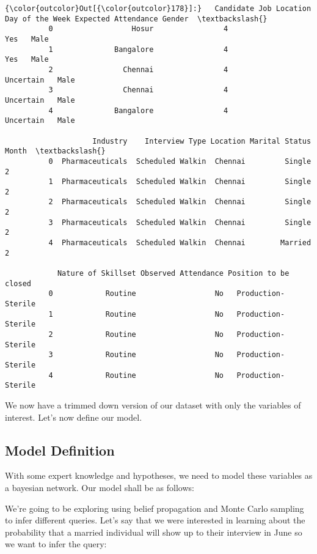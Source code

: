 \documentclass[11pt]{article}
\begin{document}
\begin{Verbatim}[commandchars=\\\{\}]
{\color{outcolor}Out[{\color{outcolor}178}]:}   Candidate Job Location  Day of the Week Expected Attendance Gender  \textbackslash{}
          0                  Hosur                4                 Yes   Male   
          1              Bangalore                4                 Yes   Male   
          2                Chennai                4           Uncertain   Male   
          3                Chennai                4           Uncertain   Male   
          4              Bangalore                4           Uncertain   Male   
          
                    Industry    Interview Type Location Marital Status  Month  \textbackslash{}
          0  Pharmaceuticals  Scheduled Walkin  Chennai         Single      2   
          1  Pharmaceuticals  Scheduled Walkin  Chennai         Single      2   
          2  Pharmaceuticals  Scheduled Walkin  Chennai         Single      2   
          3  Pharmaceuticals  Scheduled Walkin  Chennai         Single      2   
          4  Pharmaceuticals  Scheduled Walkin  Chennai        Married      2   
          
            Nature of Skillset Observed Attendance Position to be closed  
          0            Routine                  No   Production- Sterile  
          1            Routine                  No   Production- Sterile  
          2            Routine                  No   Production- Sterile  
          3            Routine                  No   Production- Sterile  
          4            Routine                  No   Production- Sterile  
\end{Verbatim}
            
    We now have a trimmed down version of our dataset with only the
variables of interest. Let's now define our model.

\subsection{Model Definition}\label{model-definition}

With some expert knowledge and hypotheses, we need to model these
variables as a bayesian network. Our model shall be as follows:

We're going to be exploring using belief propagation and Monte Carlo
sampling to infer different queries. Let's say that we were interested
in learning about the probability that a married individual will show up
to their interview in June so we want to infer the query:
\end{document}
